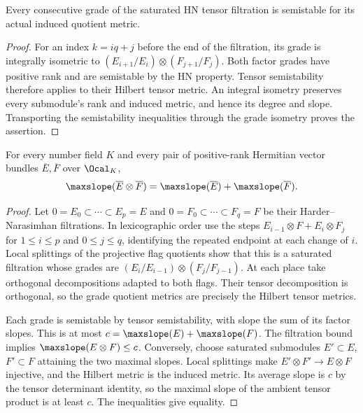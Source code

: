 \begin{lemma}
\label{lem:hn-tensor-grade-semistable}
\leanok
Every consecutive grade of the saturated HN tensor filtration is
semistable for its actual induced quotient metric.
\end{lemma}
\begin{proof}
For an index $k=iq+j$ before the end of the filtration, its grade is
integrally isometric to $(E_{i+1}/E_i)\otimes(F_{j+1}/F_j)$.
Both factor grades have positive rank and are semistable by the HN
property. Tensor semistability therefore applies to their Hilbert tensor
metric. An integral isometry preserves every submodule's rank and induced
metric, and hence its degree and slope. Transporting the semistability
inequalities through the grade isometry proves the assertion.
\end{proof}

\begin{theorem}
\label{thm:bost-main}
\leanok
For every number field $K$ and every pair of positive-rank Hermitian
vector bundles $\overline E,\overline F$ over $\Ocal_K$,
\[
 \maxslope(\overline E\otimes\overline F)
 =\maxslope(\overline E)+\maxslope(\overline F).
\]
\end{theorem}
\begin{proof}
Let $0=E_0\subset\cdots\subset E_p=E$ and
$0=F_0\subset\cdots\subset F_q=F$ be their Harder--Narasimhan
filtrations. In lexicographic order use the steps
$E_{i-1}\otimes F+E_i\otimes F_j$ for $1\leq i\leq p$ and
$0\leq j\leq q$, identifying the repeated endpoint at each change of
$i$. Local splittings of the projective flag quotients show that this
is a saturated filtration whose grades are
$(E_i/E_{i-1})\otimes(F_j/F_{j-1})$. At each place take orthogonal
decompositions adapted to both flags. Their tensor decomposition is
orthogonal, so the grade quotient metrics are precisely the Hilbert
tensor metrics.

Each grade is semistable by tensor semistability, with slope the sum
of its factor slopes. This is at most
$c=\maxslope(E)+\maxslope(F)$. The filtration bound implies
$\maxslope(E\otimes F)\leq c$.
Conversely, choose saturated submodules $E'\subset E$, $F'\subset F$
attaining the two maximal slopes. Local splittings make
$E'\otimes F'\to E\otimes F$ injective, and the Hilbert metric is
the induced metric. Its average slope is $c$ by the tensor determinant
identity, so the maximal slope of the ambient tensor product is at
least $c$. The inequalities give equality.
\end{proof}

